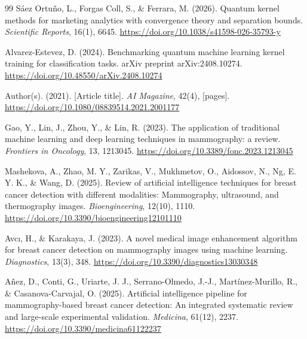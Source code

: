 \begin{thebibliography}{99}
    Sáez Ortuño, L., Forgas Coll, S., \& Ferrara, M. (2026). Quantum kernel methods
    for marketing analytics with convergence theory and separation bounds.
    \textit{Scientific Reports}, 16(1), 6645.
    \url{https://doi.org/10.1038/s41598-026-35793-y}

    Alvarez-Estevez, D. (2024). Benchmarking quantum machine learning kernel training
    for classification tasks. arXiv preprint arXiv:2408.10274.
    \url{https://doi.org/10.48550/arXiv.2408.10274}

    Author(s). (2021). [Article title]. \textit{AI Magazine}, 42(4), [pages].
    \url{https://doi.org/10.1080/08839514.2021.2001177}

    Gao, Y., Lin, J., Zhou, Y., \& Lin, R. (2023). The application of traditional
    machine learning and deep learning techniques in mammography: a review.
    \textit{Frontiers in Oncology}, 13, 1213045.
    \url{https://doi.org/10.3389/fonc.2023.1213045}

    Mashekova, A., Zhao, M. Y., Zarikas, V., Mukhmetov, O., Aidossov, N., Ng, E. Y. K., \& Wang, D. (2025).
    Review of artificial intelligence techniques for breast cancer detection with different modalities:
    Mammography, ultrasound, and thermography images. \textit{Bioengineering}, 12(10), 1110.
    \url{https://doi.org/10.3390/bioengineering12101110}

    Avcı, H., \& Karakaya, J. (2023). A novel medical image enhancement algorithm for breast cancer
    detection on mammography images using machine learning. \textit{Diagnostics}, 13(3), 348.
    \url{https://doi.org/10.3390/diagnostics13030348}

    Añez, D., Conti, G., Uriarte, J. J., Serrano-Olmedo, J.-J., Martínez-Murillo, R., \& Casanova-Carvajal, O. (2025).
    Artificial intelligence pipeline for mammography-based breast cancer detection: An integrated systematic review and
    large-scale experimental validation. \textit{Medicina}, 61(12), 2237.
    \url{https://doi.org/10.3390/medicina61122237}


\end{thebibliography}
